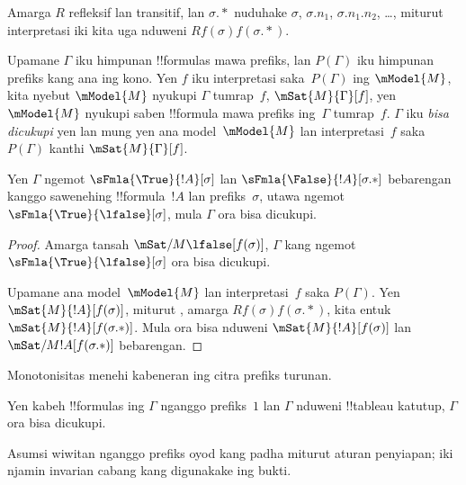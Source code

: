 \documentclass[../../../include/open-logic-section]{subfiles}
\begin{document}
Amarga $R$ refleksif lan transitif, lan $\sigma.{*}$ nuduhake
$\sigma$, $\sigma.n_1$, $\sigma.n_1.n_2$, \dots, miturut interpretasi
iki kita uga nduweni $Rf(\sigma)f(\sigma.{*})$.

\begin{defn}
  Upamane $\Gamma$ iku himpunan !!{formula}s mawa prefiks, lan
  $P(\Gamma)$ iku himpunan prefiks kang ana ing kono. Yen $f$ iku
  interpretasi saka~$P(\Gamma)$ ing $\mModel{M}$, kita nyebut
  $\mModel{M}$ nyukupi $\Gamma$ tumrap~$f$, $\mSat{M}{\Gamma}[f]$,
  yen $\mModel{M}$ nyukupi saben !!{formula} mawa prefiks ing~$\Gamma$
  tumrap~$f$. $\Gamma$ iku \emph{bisa dicukupi} yen lan mung yen ana
  model~$\mModel{M}$ lan interpretasi~$f$ saka $P(\Gamma)$ kanthi
  $\mSat{M}{\Gamma}[f]$.
\end{defn}

\begin{prop}
  Yen $\Gamma$ ngemot $\sFmla{\True}{!A}[\sigma]$ lan
  $\sFmla{\False}{!A}[\sigma.{*}]$ bebarengan kanggo sawenehing
  !!{formula}~$!A$ lan prefiks~$\sigma$, utawa ngemot
  $\sFmla{\True}{\lfalse}[\sigma]$, mula $\Gamma$ ora bisa dicukupi.
\end{prop}

\begin{proof}
  Amarga tansah $\mSat/{M}{\lfalse}[f(\sigma)]$, $\Gamma$ kang
  ngemot $\sFmla{\True}{\lfalse}[\sigma]$ ora bisa dicukupi.

  Upamane ana model~$\mModel{M}$ lan interpretasi~$f$ saka
  $P(\Gamma)$. Yen $\mSat{M}{!A}[f(\sigma)]$, miturut
  , amarga
  $Rf(\sigma)f(\sigma.{*})$, kita entuk
  $\mSat{M}{!A}[f(\sigma.{*})]$. Mula ora bisa nduweni
  $\mSat{M}{!A}[f(\sigma)]$ lan
  $\mSat/{M}{!A}[f(\sigma.{*})]$ bebarengan.
\end{proof}
Monotonisitas menehi kabeneran ing citra prefiks turunan.

\begin{thm}
  Yen kabeh !!{formula}s ing $\Gamma$ nganggo prefiks~$1$ lan $\Gamma$ nduweni !!{tableau} katutup, $\Gamma$ ora bisa dicukupi.
\end{thm}
Asumsi wiwitan nganggo prefiks oyod kang padha miturut aturan penyiapan; iki njamin invarian cabang kang digunakake ing bukti.
\end{document}

